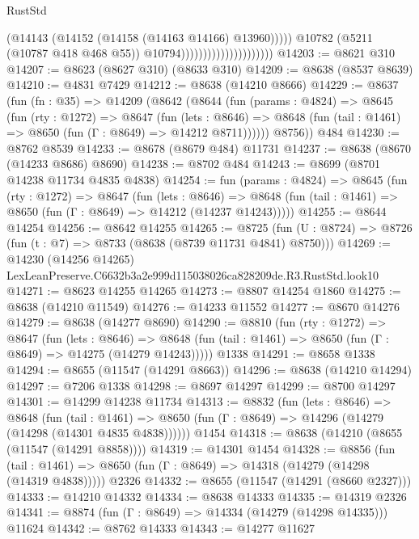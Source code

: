 \begin{lexlean}{RustStd}
\begin{coremodule}
                                                  (@14143
                                                    (@14152 (@14158 (@14163 @14166) @13960)))))
                                              @10782
                                              (@5211 (@10787 @418 @468 @55))
                                              @10794)))))))))))))))))))))
@14203 := @8621 @310
@14207 := @8623 (@8627 @310) (@8633 @310)
@14209 := @8638 (@8537 @8639)
@14210 := @4831 @7429
@14212 := @8638 (@14210 @8666)
@14229 := @8637
    (fun (fn : @35) =>
    @14209
      (@8642
        (@8644
          (fun (params : @4824) =>
          @8645
            (fun (rty : @1272) =>
            @8647
              (fun (lets : @8646) =>
              @8648 (fun (tail : @1461) => @8650 (fun (Γ : @8649) => @14212 @8711))))))
        @8756))
    @484
@14230 := @8762 @8539
@14233 := @8678 (@8679 @484) @11731
@14237 := @8638 (@8670 (@14233 @8686) @8690)
@14238 := @8702 @484
@14243 := @8699 (@8701 @14238 @11734 @4835 @4838)
@14254 := fun (params : @4824) =>
  @8645
    (fun (rty : @1272) =>
    @8647
      (fun (lets : @8646) =>
      @8648 (fun (tail : @1461) => @8650 (fun (Γ : @8649) => @14212 (@14237 @14243)))))
@14255 := @8644 @14254
@14256 := @8642 @14255
@14265 := @8725
    (fun (U : @8724) => @8726 (fun (t : @7) => @8733 (@8638 (@8739 @11731 @4841) @8750)))
@14269 := @14230 (@14256 @14265) LexLeanPreserve.C6632b3a2e999d115038026ca828209de.R3.RustStd.look10
@14271 := @8623 @14255 @14265
@14273 := @8807 @14254 @1860
@14275 := @8638 (@14210 @11549)
@14276 := @14233 @11552
@14277 := @8670 @14276
@14279 := @8638 (@14277 @8690)
@14290 := @8810
    (fun (rty : @1272) =>
    @8647
      (fun (lets : @8646) =>
      @8648 (fun (tail : @1461) => @8650 (fun (Γ : @8649) => @14275 (@14279 @14243)))))
    @1338
@14291 := @8658 @1338
@14294 := @8655 (@11547 (@14291 @8663))
@14296 := @8638 (@14210 @14294)
@14297 := @7206 @1338
@14298 := @8697 @14297
@14299 := @8700 @14297
@14301 := @14299 @14238 @11734
@14313 := @8832
    (fun (lets : @8646) =>
    @8648
      (fun (tail : @1461) =>
      @8650 (fun (Γ : @8649) => @14296 (@14279 (@14298 (@14301 @4835 @4838))))))
    @1454
@14318 := @8638 (@14210 (@8655 (@11547 (@14291 @8858))))
@14319 := @14301 @1454
@14328 := @8856
    (fun (tail : @1461) => @8650 (fun (Γ : @8649) => @14318 (@14279 (@14298 (@14319 @4838)))))
    @2326
@14332 := @8655 (@11547 (@14291 (@8660 @2327)))
@14333 := @14210 @14332
@14334 := @8638 @14333
@14335 := @14319 @2326
@14341 := @8874 (fun (Γ : @8649) => @14334 (@14279 (@14298 @14335))) @11624
@14342 := @8762 @14333
@14343 := @14277 @11627

\end{coremodule}
\end{lexlean}
